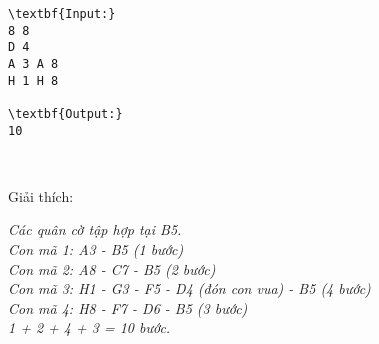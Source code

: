 \begin{verbatim}
\textbf{Input:}
8 8
D 4
A 3 A 8
H 1 H 8

\textbf{Output:}
10\end{verbatim}

 

Giải thích:

\emph{Các quân cờ tập hợp tại B5.
\\Con mã 1: A3 - B5 (1 bước)
\\Con mã 2: A8 - C7 - B5 (2 bước)
\\Con mã 3: H1 - G3 - F5 - D4 (đón con vua) - B5 (4 bước)
\\Con mã 4: H8 - F7 - D6 - B5 (3 bước)
\\1 + 2 + 4 + 3 = 10 bước. }